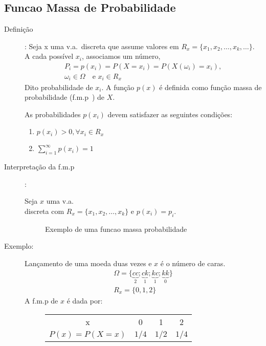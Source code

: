    \subsection{Funcao Massa de Probabilidade} 
   \begin{description}
     \item [Definição]: Seja x uma v.a.\ discreta que assume valores em $R_{x}=\{x_1,x_2,\dots,
       x_{k},\dots\}$. A cada possível $x_{i}$, associamos um número, 
       \begin{align*}
         P_{i}=p({x_i})=P(X={x_i})=P(X( \omega_i)=x_i),\\
         \omega_{i} \in \Omega \quad \text{e } x_{i} \in R_{x} \nonumber
       \end{align*}
       Dito probabilidade de $x_{i}$. A função $p(x)$ é definida como função massa de probabilidade 
       (f.m.p\ ) de $X$. 

       As probabilidades $p(x_i)$ devem satisfazer as seguintes condições: 
       \begin{enumerate}[label=(\roman*)]
         \item $p(x_i)>0, \forall x_i \in R_{x}$

         \item $\sum^\infty_{i=1} p(x_i)=1$
       \end{enumerate}
     \item [Interpretação da f.m.p\ ]: 

       Seja $x$ uma v.a.\\ discreta com $R_{x}= \{x_1,x_2,\dots,x_k \}$ e $p(x_i)=p_i$.
       \begin{figure}[htpb]
         
         \caption{Exemplo de uma funcao massa probabilidade}
         \label{fig:24}
       \end{figure}

     \item [Exemplo:] Lançamento de uma moeda duas vezes e $x$ é o número de caras.
       \begin{align*}
         \Omega = \{ \underbrace{cc}_{2}; \underbrace{ck}_{1};\underbrace{kc}_{1};\underbrace{kk}_{0} \} \\
         R_{x}= \{0,1,2\}
       \end{align*}
       A f.m.p de $x$ é dada por: 
       \begin{figure} [H]
         \begin{tabular}{ c c c c}
           \toprule
           x &0&1&2 \\ \cmidrule{1-4}
           $P(x)=P(X=x)$&$1/4$&$1/2$& $1/4$\\    \bottomrule
         \end{tabular}
         \label{tab:4}
       \end{figure}



\end{description}
